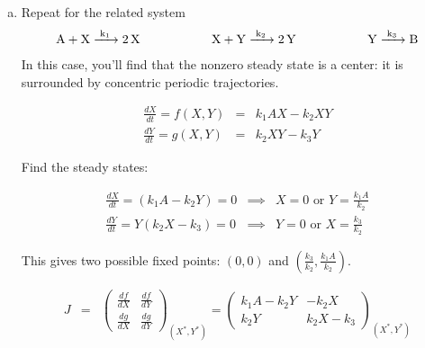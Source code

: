 \documentclass{article}
\begin{document}
\begin{enumerate}[a)]
\begin{enumerate}[i)]
{This matches our intuition from the formal stability analysis, since the origin is a saddle and trajectories along the y-axis approach the origin.
}


\item Sketch a phase portrait for the system that is consistent with your expectations from (iii) and (iv).\\

{\color{red}
Drawing not included in this file.
}
\end{enumerate}
\item Repeat for the related system
\begin{eqnarray*}
\ce{A + X ->[k_1] 2 X} \hspace{2 cm} \ce{X + Y ->[k_2] 2 Y}  \hspace{2 cm} \ce{Y ->[k_3] B} 
\end{eqnarray*}
In this case, you'll find that the nonzero steady state is a center: it is surrounded by concentric periodic trajectories.\\

{\color{red}

\begin{eqnarray*}
\frac{dX}{dt} = f(X,Y) & = & k_1A X -  k_2 XY\\
\frac{dY}{dt} = g(X,Y) & = & k_2 XY - k_3 Y
\end{eqnarray*}

Find the steady states:

\begin{eqnarray*}
\frac{dX}{dt} =\left( k_1A -  k_2Y \right) = 0 & \implies & X = 0 \textrm{ or } Y = \frac{k_1A}{k_2}\\
\frac{dY}{dt} = Y \left( k_2 X - k_3 \right) = 0 & \implies & Y=0 \textrm{ or } X = \frac{k_3}{k_2}
\end{eqnarray*}

This gives two possible fixed points: $(0, 0)$ and $(\frac{k_3}{k_2}, \frac{k_1A}{k_2})$.


\begin{eqnarray*}
J & = & \begin{pmatrix} \frac{df}{dX} & \frac{df}{dY}\\ \frac{dg}{dX} & \frac{dg}{dY} \end{pmatrix}_{(X^*, Y^*)} = \begin{pmatrix} k_1 A - k_2 Y & -k_2 X\\ k_2 Y & k_2 X - k_3 \end{pmatrix}_{(X^*, Y^*)}
\end{eqnarray*}

}
\end{enumerate}
\end{document}
